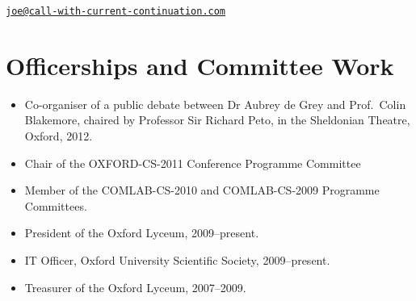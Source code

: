 \documentclass[12pt,twoside,letterpaper]{article}
\begin{document}


\vspace{-10mm}


\vspace{-7mm}


% 

\vspace{-7mm}


\newpage


\vspace*{-28mm}


\vspace{-7mm}


\vspace{-7mm}


\vspace{-7mm}


\vspace{-7mm}


\vspace{-4.5mm}


\noindent


\newpage


\vspace*{-23mm}\hfill\href{mailto:joe@call-with-current-continuation.com}%
{\nolinkurl{joe@call-with-current-continuation.com}}

\vspace{-3mm}
\section*{Officerships and Committee Work}
\vspace{-2mm}

\begin{itemize}
	\item Co-organiser of a public debate between Dr Aubrey de Grey
		and Prof.\ Colin Blakemore, chaired by Professor Sir Richard
		Peto, in the Sheldonian Theatre, Oxford, 2012.
	\item Chair of the OXFORD-CS-2011 Conference Programme Committee
	\item Member of the COMLAB-CS-2010 and COMLAB-CS-2009 Programme
		Committees.
	\item President of the Oxford Lyceum, 2009--present.
	\item IT Officer, Oxford University Scientific Society, 2009--present.
	\item Treasurer of the Oxford Lyceum, 2007--2009.
\end{itemize}
\end{document}
